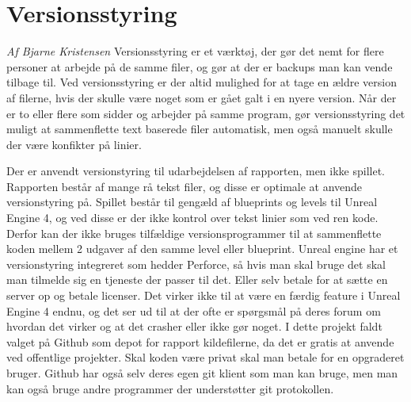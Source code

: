 \section{Versionsstyring}
\textit{Af Bjarne Kristensen}\newline
Versionsstyring er et værktøj, der gør det nemt for flere personer at arbejde på de samme filer, og gør at der er backups man kan vende tilbage til. Ved versionsstyring er der altid mulighed for at tage en ældre version af filerne, hvis der skulle være
noget som er gået galt i en nyere version. Når der er to eller flere som sidder og arbejder på samme program, gør versionsstyring det muligt at sammenflette text baserede filer automatisk, men også manuelt skulle der være konfikter på linier.

Der er anvendt versionstyring til udarbejdelsen af rapporten, men ikke spillet. Rapporten består af mange rå tekst filer, og disse er optimale at anvende versionstyring på. Spillet består til gengæld af blueprints og levels til Unreal Engine 4, og ved disse er der ikke kontrol over tekst linier som ved ren kode. Derfor kan der ikke bruges tilfældige versionsprogrammer til at sammenflette koden mellem 2 udgaver af den samme level eller blueprint. Unreal engine har et versionstyring integreret som hedder Perforce, så hvis man skal bruge det skal man tilmelde sig en tjeneste der passer til det. Eller selv betale for at sætte en server op og betale licenser. Det virker ikke til at være en færdig feature i Unreal Engine 4 endnu, og det ser ud til at der ofte er spørgsmål på deres forum om hvordan det virker og at det crasher eller ikke gør noget\cite{blueprintmerge}.
I dette projekt faldt valget på Github som depot for rapport kildefilerne, da det er gratis at anvende ved offentlige projekter. Skal koden være privat skal man betale for en opgraderet bruger\cite{githubterms}. Github har også selv deres egen git klient som man kan bruge, men man kan også bruge andre programmer der understøtter git protokollen.